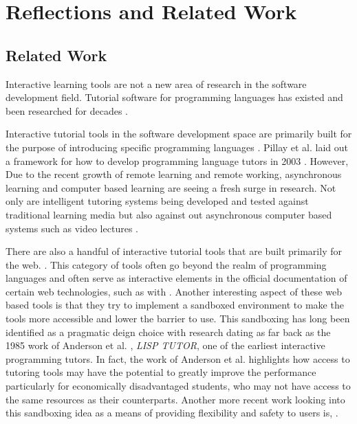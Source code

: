 \chapter{Reflections and Related Work}
\label{chap:reflection}
\section{Related Work}

Interactive learning tools are not a new area of research in the software
development field. Tutorial software for programming languages has existed  and
been researched for decades \cite{anderson1985lisp,
	anderson1986automatedtutoring, gerdes2012interactive,
	permpool2019interactive, lee2005intelligent, jeuring2011programming,
	holland2009j,  schez2020intelligent}.

Interactive tutorial tools in the software development space are primarily
built for the purpose of introducing specific programming languages
\cite{donehaskell, holland2009j, ajayi2010development, lee2005intelligent}.
Pillay et al. laid out a framework for how to develop programming language
tutors in 2003 \cite{pillay2003developing}. However, Due to the recent growth
of remote learning and remote working, asynchronous learning and computer based
learning are seeing a fresh surge in research. Not only are intelligent
tutoring systems being developed and tested against traditional learning media
but also against out asynchronous computer based systems such as video lectures
\cite{becker201950, ossovski2022comparing}.

There are also a handful of interactive tutorial tools that are built primarily
for the web. \cite{donehaskell, harris_team, harris_team, herweijer,
lee2005intelligent}. This category of tools often go beyond the realm of
programming languages and often serve as interactive elements in the official
documentation of certain web technologies, such as with
\cite{harris_team,team_meta}. Another interesting aspect of these web based
tools is that they try to implement a sandboxed environment to make the tools
more accessible and lower the barrier to use. This sandboxing has long been
identified as a pragmatic deign choice with research dating as far back as the
1985 work of Anderson et al. \cite{anderson1985lisp}, \textit{LISP TUTOR}, one
of the earliest interactive programming tutors. In fact, the work of Anderson
et al. highlights how access to tutoring tools may have the potential to
greatly improve the performance particularly for economically disadvantaged
students, who may not have access to the same resources as their counterparts.
Another more recent work looking into this sandboxing idea as a means of
providing flexibility and safety to users is, \cite{permpool2019interactive}.

